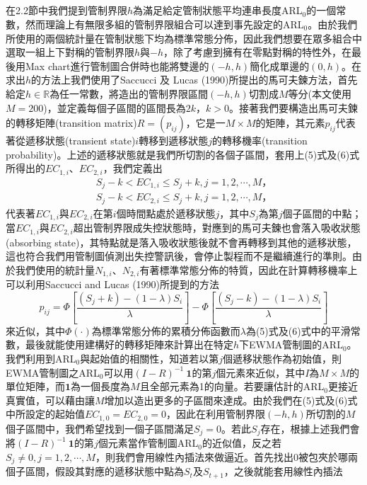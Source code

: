 \documentclass[12pt]{article}  %
\theoremstyle{plain}
\begin{document}
\subsection{}
在2.2節中我們提到管制界限$h$為滿足給定管制狀態平均連串長度ARL$_0$的一個常數，然而理論上有無限多組的管制界限組合可以達到事先設定的ARL$_0$。由於我們所使用的兩個統計量在管制狀態下均為標準常態分佈，因此我們想要在眾多組合中選取一組上下對稱的管制界限$h$與$-h$，除了考慮到擁有在零點對稱的特性外，在最後用Max chart進行管制圖合併時也能將雙邊的$(-h,h)$簡化成單邊的$(0,h)$。在求出$h$的方法上我們使用了Saccucci 及 Lucas (1990)所提出的馬可夫鍊方法，首先給定$h\in \mathbb{R}$為任一常數，將造出的管制界限區間$(-h,h)$切割成$M$等分(本文使用$M=200$)，並定義每個子區間的區間長為$2k$，$k>0$。接著我們要構造出馬可夫鍊的轉移矩陣(transition matrix)$R=(p_{ij})$，它是一$M\times M$的矩陣，其元素$p_{ij}$代表著從遞移狀態(transient state)$i$轉移到遞移狀態$j$的轉移機率(transition probability)。上述的遞移狀態就是我們所切割的各個子區間，套用上(5)式及(6)式所得出的$EC_{1,i}$、$EC_{2,i}$，我們定義出
\begin{align}
S_j-k< EC_{1,i} \leq S_j+k,j=1,2,\cdots,M \mbox{，}\\
S_j-k< EC_{2,i} \leq S_j+k,j=1,2,\cdots,M \mbox{，}
\end{align}
代表著$EC_{1,i}$與$EC_{2,i}$在第$i$個時間點處於遞移狀態$j$，其中$S_j$為第$j$個子區間的中點；當$EC_{1,i}$與$EC_{2,i}$超出管制界限成失控狀態時，對應到的馬可夫鍊也會落入吸收狀態(absorbing state)，其特點就是落入吸收狀態後就不會再轉移到其他的遞移狀態，這也符合我們用管制圖偵測出失控警訊後，會停止製程而不是繼續進行的準則。由於我們使用的統計量$N_{1,i}$、$N_{2,i}$有著標準常態分佈的特質，因此在計算轉移機率上可以利用Saccucci and Lucas (1990)所提到的方法
\begin{equation}
p_{ij}=\Phi\left[\frac{(S_j+k)-(1-\lambda)S_i}{\lambda}\right]-\Phi\left[\frac{(S_j-k)-(1-\lambda)S_i}{\lambda}\right]
\end{equation}
來近似，其中$\Phi(\cdot)$為標準常態分佈的累積分佈函數而$\lambda$為(5)式及(6)式中的平滑常數，最後就能使用建構好的轉移矩陣來計算出在特定$h$下EWMA管制圖的ARL$_0$。我們利用到ARL$_0$與起始值的相關性，知道若以第$j$個遞移狀態作為初始值，則EWMA管制圖之ARL$_0$可以用$(I-R)^{-1}~\mathbf{1}$的第$j$個元素來近似，其中$I$為$M\times M$的單位矩陣，而$\mathbf{1}$為一個長度為$M$且全部元素為1的向量。若要讓估計的ARL$_0$更接近真實值，可以藉由讓$M$增加以造出更多的子區間來達成。由於我們在(5)式及(6)式中所設定的起始值$EC_{1,0}=EC_{2,0}=0$，因此在利用管制界限$(-h,h)$所切割的$M$個子區間中，我們希望找到一個子區間滿足$S_j=0$。若此$S_j$存在，根據上述我們會將$(I-R)^{-1}~\mathbf{1}$的第$j$個元素當作管制圖ARL$_0$的近似值，反之若$S_j\neq 0,j=1,2,\cdots,M$，則我們會用線性內插法來做逼近。首先找出0被包夾於哪兩個子區間，假設其對應的遞移狀態中點為$S_t$及$S_{t+1}$，之後就能套用線性內插法
\end{document}

